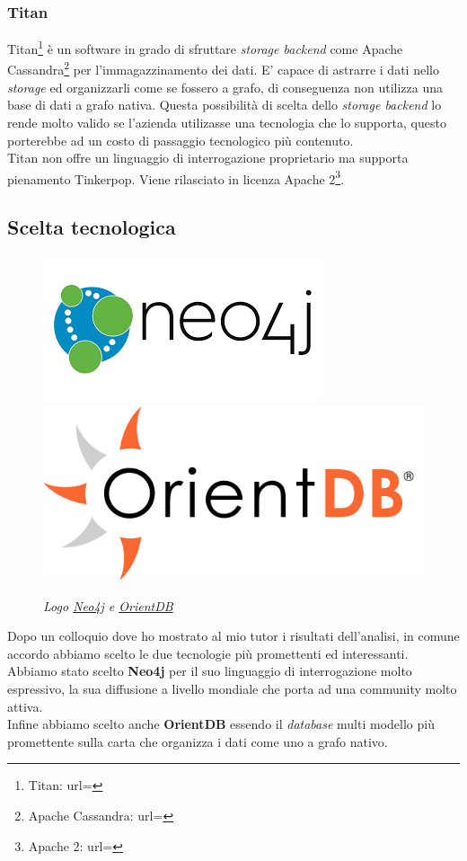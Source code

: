 \subsubsection{Titan}
Titan\footnote{Titan: url= } è un software in grado di sfruttare \textit{storage backend} come Apache Cassandra\footnote{Apache Cassandra: url= } per l'immagazzinamento dei dati. E' capace di astrarre i dati nello \textit{storage} ed organizzarli come se fossero a grafo, di conseguenza non utilizza una base di dati a grafo nativa.
Questa possibilità di scelta dello \textit{storage backend} lo rende molto valido se l'azienda utilizasse una tecnologia che lo supporta, questo porterebbe ad un costo di passaggio tecnologico più contenuto.\\
Titan non offre un linguaggio di interrogazione proprietario ma supporta pienamento Tinkerpop.  Viene rilasciato in licenza Apache 2\footnote{Apache 2: url= }.
\newpage
\subsection{Scelta tecnologica}
\begin{figure}[h!]
	\centering
	\includegraphics[scale=0.45]{immagini/neo4j.png}
	\includegraphics[scale=0.3]{immagini/orientdb.png}
	\caption{\textit{Logo \href{https://neo4j.com/}{Neo4j} e \href{http://orientdb.com/orientdb/}{OrientDB}}}
\end{figure}
Dopo un colloquio dove ho mostrato al mio tutor i risultati dell'analisi, in comune accordo abbiamo scelto le due tecnologie più promettenti ed interessanti.\\
Abbiamo stato scelto \textbf{Neo4j} per il suo linguaggio di interrogazione molto espressivo, la sua diffusione a livello mondiale che porta ad una community molto attiva.\\
Infine abbiamo scelto anche \textbf{OrientDB} essendo il \textit{database} multi modello più promettente sulla carta che organizza i dati come uno a grafo nativo.

